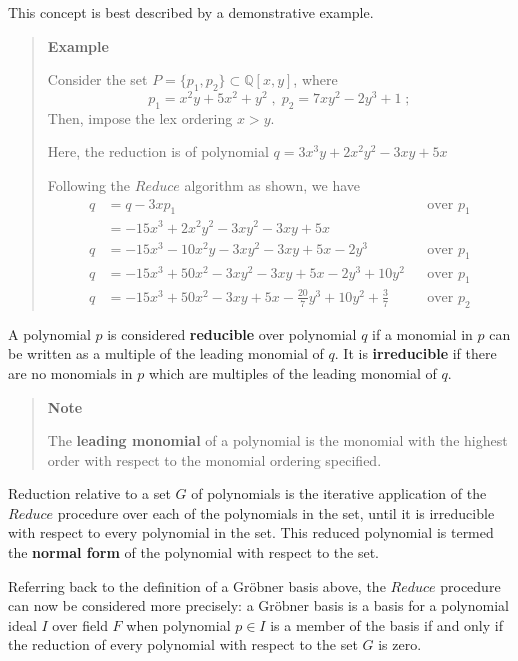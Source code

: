 \documentclass[letterpaper,12pt,titlepage,oneside,final]{book}
\newenvironment{example}{\begin{quote}%
  \textbf{Example }%
  \quad
}{%
\end{quote}%
}
\newenvironment{note}{\begin{quote}%
  \textbf{Note }%
  \quad
}{%
\end{quote}%
}
\begin{document}
This concept is best described by a demonstrative example. \cite{Geddes}

\begin{example}
  Consider the set ${P = \{p_1, p_2\} \subset \mathbb{Q}[x, y]}$, where 
  \begin{equation*}
    p_1 = x^2y + 5x^2 + y^2 \; , \; p_2 = 7xy^2 - 2y^3 + 1 \; ;
  \end{equation*}
  Then, impose the lex ordering ${x > y}$.  

  Here, the reduction is of polynomial ${q = 3x^3y + 2x^2y^2 - 3xy + 5x}$

  Following the ${Reduce}$ algorithm as shown, we have
  \begin{align*}
    q &= q - 3xp_1 && \textrm{over } p_1\\
      &= -15x^3 + 2x^2y^2 - 3xy^2 - 3xy + 5x\\
    q &= -15x^3 - 10x^2y - 3xy^2 - 3xy + 5x - 2y^3 && \textrm{over } p_1\\
    q &= -15x^3 + 50x^2 - 3xy^2 -3xy + 5x - 2y^3 + 10y^2 && \textrm{over } p_1\\
    q &= -15x^3 + 50x^2 - 3xy + 5x - \frac{20}{7}y^3 + 10y^2 + \frac{3}{7} && \textrm{over } p_2
  \end{align*}
\end{example}

A polynomial ${p}$ is considered \textbf{reducible} over polynomial ${q}$ if a monomial in ${p}$ can be written as a multiple of the leading monomial of ${q}$.  It is \textbf{irreducible} if there are no monomials in ${p}$ which are multiples of the leading monomial of ${q}$.    

\begin{note}
  The \textbf{leading monomial} of a polynomial is the monomial with the highest order with respect to the monomial ordering specified.
\end{note}   

Reduction relative to a set ${G}$ of polynomials is the iterative application of the ${Reduce}$ procedure over each of the polynomials in the set, until it is irreducible with respect to every polynomial in the set.  This reduced polynomial is termed the \textbf{normal form} of the polynomial with respect to the set.

Referring back to the definition of a Gr\"obner basis above, the ${Reduce}$ procedure can now be considered more precisely: a Gr\"obner basis is a basis for a polynomial ideal ${I}$ over field ${F}$ when polynomial ${p \in I}$ is a member of the basis if and only if the reduction of every polynomial with respect to the set ${G}$ is zero. 
\end{document}
